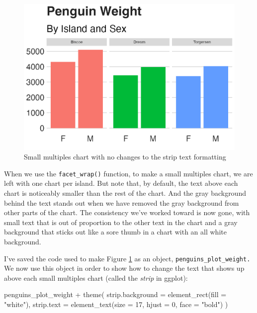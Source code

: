 \documentclass[
]{book}
\newenvironment{Shaded}{\begin{snugshade}}{\end{snugshade}}
\newcommand{\AttributeTok}[1]{\textcolor[rgb]{0.77,0.63,0.00}{#1}}
\newcommand{\DecValTok}[1]{\textcolor[rgb]{0.00,0.00,0.81}{#1}}
\newcommand{\FunctionTok}[1]{\textcolor[rgb]{0.00,0.00,0.00}{#1}}
\newcommand{\NormalTok}[1]{#1}
\newcommand{\SpecialCharTok}[1]{\textcolor[rgb]{0.00,0.00,0.00}{#1}}
\newcommand{\StringTok}[1]{\textcolor[rgb]{0.31,0.60,0.02}{#1}}
\begin{document}
\begin{figure}
\includegraphics[width=1\linewidth]{custom-theme_files/figure-latex/penguin-facetted-plot-1} \caption{Small multiples chart with no changes to the strip text formatting}\label{fig:penguin-facetted-plot}
\end{figure}

When we use the \texttt{facet\_wrap()} function, to make a small multiples chart, we are left with one chart per island. But note that, by default, the text above each chart is noticeably smaller than the rest of the chart. And the gray background behind the text stands out when we have removed the gray background from other parts of the chart. The consistency we've worked toward is now gone, with small text that is out of proportion to the other text in the chart and a gray background that sticks out like a sore thumb in a chart with an all white background.

I've saved the code used to make Figure \ref{fig:penguin-facetted-plot} as an object, \texttt{penguins\_plot\_weight.} We now use this object in order to show how to change the text that shows up above each small multiples chart (called the \emph{strip} in ggplot):

\begin{Shaded}
\begin{Highlighting}[]
\NormalTok{penguins\_plot\_weight }\SpecialCharTok{+}
  \FunctionTok{theme}\NormalTok{(}
    \AttributeTok{strip.background =} \FunctionTok{element\_rect}\NormalTok{(}\AttributeTok{fill =} \StringTok{"white"}\NormalTok{),}
    \AttributeTok{strip.text =} \FunctionTok{element\_text}\NormalTok{(}\AttributeTok{size =} \DecValTok{17}\NormalTok{, }\AttributeTok{hjust =} \DecValTok{0}\NormalTok{, }\AttributeTok{face =} \StringTok{"bold"}\NormalTok{)}
\NormalTok{  )}
\end{Highlighting}
\end{Shaded}
\end{document}
